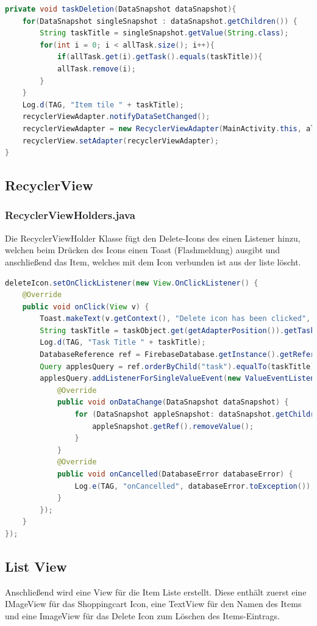 \begin{lstlisting}[language=java]
private void taskDeletion(DataSnapshot dataSnapshot){
	for(DataSnapshot singleSnapshot : dataSnapshot.getChildren()) {
		String taskTitle = singleSnapshot.getValue(String.class);
		for(int i = 0; i < allTask.size(); i++){
			if(allTask.get(i).getTask().equals(taskTitle)){
			allTask.remove(i);
		}
	}
	Log.d(TAG, "Item tile " + taskTitle);
	recyclerViewAdapter.notifyDataSetChanged();
	recyclerViewAdapter = new RecyclerViewAdapter(MainActivity.this, allTask);
	recyclerView.setAdapter(recyclerViewAdapter);
}
\end{lstlisting}

\subsection{RecyclerView}
\subsubsection{RecyclerViewHolders.java}
Die RecyclerViewHolder Klasse fügt den Delete-Icons des einen Listener hinzu, welchen beim Drücken des Icons einen Toast (Flashmeldung) ausgibt und anschließend das Item, welches mit dem Icon verbunden ist aus der liste löscht.
\begin{lstlisting}[language=java]
deleteIcon.setOnClickListener(new View.OnClickListener() {
	@Override
	public void onClick(View v) {
		Toast.makeText(v.getContext(), "Delete icon has been clicked", Toast.LENGTH_LONG).show();
		String taskTitle = taskObject.get(getAdapterPosition()).getTask();
		Log.d(TAG, "Task Title " + taskTitle);
		DatabaseReference ref = FirebaseDatabase.getInstance().getReference();
		Query applesQuery = ref.orderByChild("task").equalTo(taskTitle);
		applesQuery.addListenerForSingleValueEvent(new ValueEventListener() {
			@Override
			public void onDataChange(DataSnapshot dataSnapshot) {
				for (DataSnapshot appleSnapshot: dataSnapshot.getChildren()) {
					appleSnapshot.getRef().removeValue();
				}
			}
			@Override
			public void onCancelled(DatabaseError databaseError) {
				Log.e(TAG, "onCancelled", databaseError.toException());
			}
		});
	}
});
\end{lstlisting}
\clearpage
\subsection{List View}
Anschließend wird eine View für die Item Liste erstellt. Diese enthält zuerst eine IMageView für das Shoppingcart Icon, eine TextView für den Namen des Items und eine ImageView für das Delete Icon zum Löschen des Items-Eintrags.

